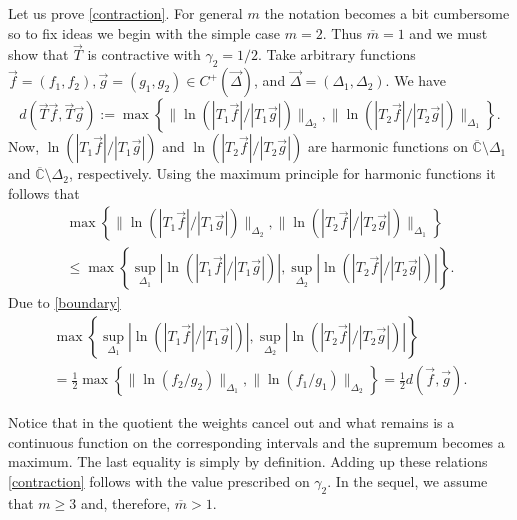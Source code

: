 \documentclass{amsart}
\numberwithin{equation}{section}
\theoremstyle{definition}
\newcommand{\CC}{\mathbb{C}}      %
\begin{document}
 Let us prove \eqref{contraction}. For general $m$ the notation becomes a bit cumbersome so to fix ideas we begin with the simple case $m=2$. Thus $\overline{m}=1$ and we must show that $\vec{T}$ is contractive with $\gamma_2 = 1/2$. Take arbitrary functions $\vec{f} = (f_1,f_2), \vec{g} = (g_1,g_2) \in  {C}^+({\vec{\Delta}})$, and $\vec{\Delta} = (\Delta_1,\Delta_2)$. We have
 \[
   d(\vec{T}\vec{f},\vec{T}\vec{g}) :=  \max\left\{  \|\ln (|T_1\vec{f}|/|T_1\vec{g}|)\|_{\Delta_2},   \|\ln (|T_2\vec{f}|/|T_2\vec{g}|)\|_{\Delta_1} \right\}.
  \]
 Now, $\ln (|T_1\vec{f}|/|T_1\vec{g}|)$ and $ \ln (|T_2\vec{f}|/|T_2\vec{g}|)$ are harmonic functions on $\overline{\CC} \setminus \Delta_1$ and $\overline{\CC} \setminus \Delta_2$, respectively. Using the maximum principle for harmonic functions it follows that
 \begin{multline*}
 	\max\left\{  \|\ln (|T_1\vec{f}|/|T_1\vec{g}|)\|_{\Delta_2},   \|\ln (|T_2\vec{f}|/|T_2\vec{g}|)\|_{\Delta_1} \right\} \\ \leq \max\left\{\sup_{\Delta_1} |\ln (|T_1\vec{f}|/|T_1\vec{g}|)| , \sup_{\Delta_2} |\ln (|T_2\vec{f}|/|T_2\vec{g}|)|\right\}.
 \end{multline*}
  Due to \eqref{boundary}
  \begin{multline*}
  	\max\left\{\sup_{\Delta_1} |\ln (|T_1\vec{f}|/|T_1\vec{g}|)| , \sup_{\Delta_2} |\ln (|T_2\vec{f}|/|T_2\vec{g}|)|\right\} \\
  	= \frac{1}{2} \max\left\{\|\ln (f_2/g_2)\|_{\Delta_1} ,\|\ln (f_1/ g_1)\|_{\Delta_2}\right\} = \frac{1}{2} d(\vec{f},\vec{g}).
  \end{multline*}

  Notice that in the quotient the weights cancel out and what remains is a continuous function on the corresponding intervals and  the supremum becomes a maximum. The last equality is simply by definition. Adding up these relations \eqref{contraction} follows with the value prescribed on $\gamma_2$. In the sequel, we assume that $m \geq 3$ and, therefore, $\overline{m} > 1$.
\end{document}
